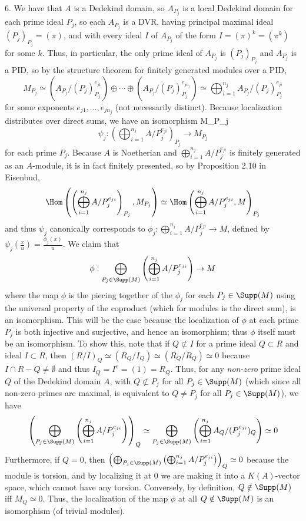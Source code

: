 \documentclass[11pt]{article}
\begin{document}
\num{6.} We have that $A$ is a Dedekind domain, so $A_{P_j}$ is a local
Dedekind domain for each prime ideal $P_j$, so each $A_{P_j}$ is a DVR,
having principal maximal ideal $(P_j)_{P_j}=(\pi)$, and with every ideal $I$
of $A_{P_j}$ of the form $I=(\pi)^k=(\pi^k)$ for some $k$. Thus, in particular,
the only prime ideal of $A_{P_j}$ is $(P_j)_{P_j}$ and $A_{P_j}$ is a PID,
so by the structure theorem for finitely generated modules over a PID, 
\[M_{P_j}\simeq
(A_{P_j}/(P_j)_{P_j}^{e_{j1}})\oplus\cdots\oplus(A_{P_j}/(P_j)_{P_j}^{e_{jn_j}})\simeq\bigoplus_{i=1}^{n_j}
A_{P_j}/(P_j)_{P_j}^{e_{ji}}\]
for some exponents $e_{j1},\ldots,e_{jn_j}$ (not necessarily distinct). Because
localization distributes over direct sums, we have an isomorphism
M_{P_j}\]
\[\psi_j:\left(\bigoplus_{i=1}^{n_j} A/P_j^{e_{ji}}\right)_{P_j}\rightarrow
M_{P_j}\]
for each prime $P_j$. Because $A$ is Noetherian and $\bigoplus_{i=1}^{n_j}
A/P_j^{e_{ji}}$ is finitely generated as an $A$-module, it is in fact finitely
presented, so by Proposition 2.10 in Eisenbud, 
\[\Hom\left(\left(\bigoplus_{i=1}^{n_j}
A/P_j^{e_{ji}}\right)_{P_j},M_{P_j}\right)\simeq\Hom\left(\bigoplus_{i=1}^{n_j}
A/P_j^{e_{ji}},M\right)_{P_j}\]
and thus $\psi_j$ canonically corresponds to
$\phi_j:\bigoplus_{i=1}^{n_j} A/P_j^{e_{ji}}\rightarrow M$, defined by
$\psi_j(\frac{x}{u})=\frac{\phi_j(x)}{u}$. We claim that 
\[\phi:\bigoplus_{P_j\in\Supp(M)}\left(\bigoplus_{i=1}^{n_j}
A/P_j^{e_{ji}}\right)\rightarrow M\]
where the map $\phi$ is the piecing together of the $\phi_j$ for
each $P_j\in\Supp(M)$ using the universal property of the coproduct
(which for modules is the direct sum), is an isomorphism. This
will be the case because the localization of $\phi$ at each prime
$P_j$ is both injective and surjective, and hence an isomorphism;
thus $\phi$ itself must be an isomorphism. To show this, note that if
$Q\not\subset I$ for a prime ideal $Q\subset R$ and ideal $I\subset R$, then
$(R/I)_Q\simeq(R_Q/I_Q)\simeq(R_Q/R_Q)\simeq0$ because $I\cap R-Q\neq\emptyset$
and thus $I_Q=I^e=(1)=R_Q$. Thus, for any \textit{non-zero} prime ideal $Q$
of the Dedekind domain $A$, with $Q\not\subset P_j$ for all $P_j\in\Supp(M)$
(which since all non-zero primes are maximal, is equivalent to $Q\neq P_j$
for all $P_j\in\Supp(M)$), we have
\[\left(\bigoplus_{P_j\in\Supp(M)}\left(\bigoplus_{i=1}^{n_j}
A/P_j^{e_{ji}}\right)\right)_Q\simeq\bigoplus_{P_j\in\Supp(M)}\left(\bigoplus_{i=1}^{n_j}
A_Q/(P_j^{e_{ji}})_Q\right)\simeq0 \]
Furthermore, if $Q=0$, then
$\left(\bigoplus_{P_j\in\Supp(M)}\left(\bigoplus_{i=1}^{n_j}
A/P_j^{e_{ji}}\right)\right)_Q\simeq 0$ because the module is torsion, and by
localizing it at 0 we are making it into a $K(A)$-vector space, which cannot
have any torsion. Conversely, by definition, $Q\notin\Supp(M)$ iff $M_Q\simeq
0$. Thus, the localization of the map $\phi$ at all $Q\notin\Supp(M)$ is an
isomorphism (of trivial modules).\\
\end{document}
